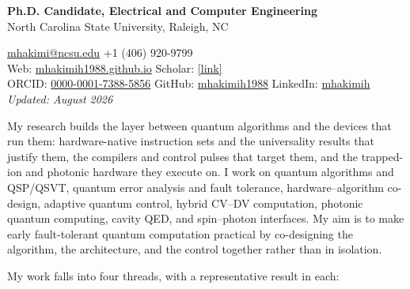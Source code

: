 \documentclass[10.5pt,letterpaper]{article}
\newcommand{\cvsec}[1]{%
  \par\needspace{4\baselineskip}\vspace{11pt}%
  \noindent\makebox[0pt][r]{%
    \smash{\parbox[t]{1.45in}{\raggedright\footnotesize\bfseries\MakeUppercase{#1}}}%
    \hspace{0.30in}}%
  \ignorespaces}
\newcommand{\todo}[1]{{\color{gray}\itshape #1}}
\begin{document}
\noindent{}%
{\large\bfseries Ph.D. Candidate, Electrical and Computer Engineering}\\[2pt]
North Carolina State University, Raleigh, NC

\cvsec{Contact\\Information}
\href{mailto:mhakimi@ncsu.edu}{mhakimi@ncsu.edu} \quad +1 (406) 920-9799\\
Web: \href{https://mhakimih1988.github.io/}{mhakimih1988.github.io} \quad
Scholar: \href{https://scholar.google.com/citations?user=VVedtiAAAAAJ}{[link]}\\
ORCID: \href{https://orcid.org/0000-0001-7388-5856}{0000-0001-7388-5856} \quad
GitHub: \href{https://github.com/mhakimih1988}{mhakimih1988} \quad
LinkedIn: \href{https://www.linkedin.com/in/mhakimih/}{mhakimih}\\[2pt]
\todo{Updated: August 2026}

\cvsec{Research\\Interests}
My research builds the layer between quantum algorithms and the devices that run them:
hardware-native instruction sets and the universality results that justify them, the
compilers and control pulses that target them, and the trapped-ion and photonic hardware
they execute on. I work on quantum algorithms and QSP/QSVT, quantum error analysis and
fault tolerance, hardware--algorithm co-design, adaptive quantum control, hybrid CV--DV
computation, photonic quantum computing, cavity QED, and spin--photon interfaces. My aim
is to make early fault-tolerant quantum computation practical by co-designing the
algorithm, the architecture, and the control together rather than in isolation.

My work falls into four threads, with a representative result in each:
\end{document}
